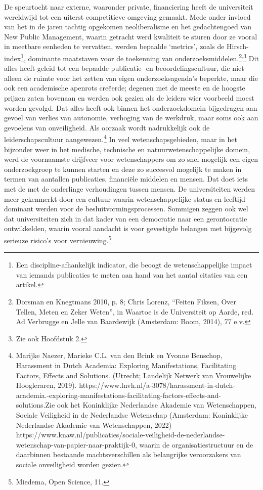 \documentclass[empirical, authordate, ]{new-jote-article}
\begin{document}
	De speurtocht naar externe, waaronder private, financiering heeft de universiteit wereldwijd tot een uiterst competitieve omgeving gemaakt. Mede onder invloed van het in de jaren tachtig opgekomen neoliberalisme en het gedachtengoed van New Public Management, waarin getracht werd kwaliteit te sturen door ze vooral in meetbare eenheden te vervatten, werden bepaalde ‘metrics', zoals de Hirsch-index\footnote{Een discipline-afhankelijk indicator, die beoogt de wetenschappelijke impact van iemands publicaties te meten aan hand van het aantal citaties van een artikel. }, dominante maatstaven voor de toekenning van onderzoeksmiddelen.\footnote{Dorsman en Knegtmans 2010, p. 8; Chris Lorenz, “Feiten Fiksen, Over Tellen, Meten en Zeker Weten”, in Waartoe is de Universiteit op Aarde, red. Ad Verbrugge en Jelle van Baardewijk (Amsterdam: Boom, 2014), 77 e.v.}\textsuperscript{,}\footnote{Zie ook Hoofdstuk 2.} Dit alles heeft geleid tot een bepaalde publicatie- en beoordelingscultuur, die niet alleen de ruimte voor het zetten van eigen onderzoeksagenda's beperkte, maar die ook een academische apenrots creëerde; degenen met de meeste en de hoogste prijzen zaten bovenaan en werden ook gezien als de leiders wier voorbeeld moest worden gevolgd. Dat alles heeft ook binnen het onderzoekdomein bijgedragen aan gevoel van verlies van autonomie, verhoging van de werkdruk, maar soms ook aan gevoelens van onveiligheid. Als oorzaak wordt nadrukkelijk ook de leiderschapscultuur aangewezen.\footnote{Marijke Naezer, Marieke C.L. van den Brink en Yvonne Benschop, Harassment in Dutch Academia: Exploring Manifestations, Facilitating Factors, Effects and Solutions. (Utrecht; Landelijk Netwerk van Vrouwelijke Hoogleraren, 2019). https://www.lnvh.nl/a-3078/harassment-in-dutch-academia.-exploring-manifestations-facilitating-factors-effects-and-solutions.Zie ook het Koninklijke Nederlandse Akademie van Wetenschappen, Sociale Veiligheid in de Nederlandse Wetenschap (Amsterdam: Koninklijke Nederlandse Akademie van Wetenschappen, 2022) https://www.knaw.nl/publicaties/sociale-veiligheid-de-nederlandse-wetenschap-van-papier-naar-praktijk-0, waarin de organisatiestructuur en de daarbinnen bestaande machtsverschillen als belangrijke veroorzakers van sociale onveiligheid worden gezien.} In veel wetenschapsgebieden, maar in het bijzonder weer in het medische, technische en natuurwetenschappelijke domein, werd de voornaamste drijfveer voor wetenschappers om zo snel mogelijk een eigen onderzoekgroep te kunnen starten en deze zo succesvol mogelijk te maken in termen van aantallen publicaties, financiële middelen en mensen. Dat doet iets met de met de onderlinge verhoudingen tussen mensen. De universiteiten werden meer gekenmerkt door een cultuur waarin wetenschappelijke status en leeftijd dominant werden voor de besluitvormingsprocessen. Sommigen zeggen ook wel dat universiteiten zich in dat kader van een democratie naar een gerontocratie ontwikkelden, waarin vooral aandacht is voor gevestigde belangen met bijgevolg serieuze risico's voor vernieuwing.\footnote{Miedema, Open Science, 11.}
\end{document}
